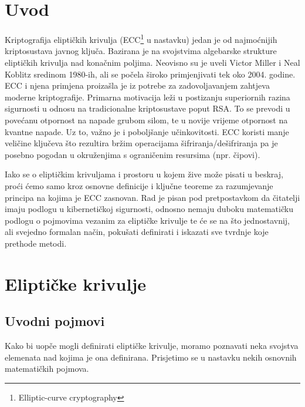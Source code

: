 \documentclass{mathos}
\begin{document}
\chapter{Uvod}

\bigskip
\noindent
Kriptografija eliptičkih krivulja (ECC\footnote{Elliptic-curve cryptography} u nastavku) jedan je od najmoćnijih kriptosustava javnog ključa. Bazirana je na svojstvima algebarske strukture eliptičkih krivulja nad konačnim poljima. Neovisno su je uveli Victor Miller i Neal Koblitz sredinom 1980-ih, ali se počela široko primjenjivati tek oko 2004. godine. ECC i njena primjena proizašla je iz potrebe za zadovoljavanjem zahtjeva moderne kriptografije. Primarna motivacija leži u postizanju superiornih razina sigurnosti u odnosu na tradicionalne kriptosustave poput RSA. To se prevodi u povećanu otpornost na napade grubom silom, te u novije vrijeme otpornost na kvantne napade. Uz to, važno je i poboljšanje učinkovitosti. ECC koristi manje veličine ključeva što rezultira bržim operacijama šifriranja/dešifriranja pa je posebno pogodan u okruženjima s ograničenim resursima (npr. čipovi).

Iako se o eliptičkim krivuljama i prostoru u kojem žive može pisati u beskraj, proći ćemo samo kroz osnovne definicije i ključne teoreme za razumjevanje principa na kojima je ECC zasnovan. Rad je pisan pod pretpostavkom da čitatelji imaju podlogu u kibernetičkoj sigurnosti, odnosno nemaju duboku matematičku podlogu o pojmovima vezanim za eliptičke krivulje te će se na što jednostavnij, ali svejedno formalan način, pokušati definirati i iskazati sve tvrdnje koje prethode metodi.


\chapter{Eliptičke krivulje}

\section{Uvodni pojmovi}
Kako bi uopče mogli definirati eliptičke krivulje, moramo poznavati neka svojstva elemenata nad kojima je ona definirana. Prisjetimo se u nastavku nekih osnovnih matematičkih pojmova.
\end{document}
